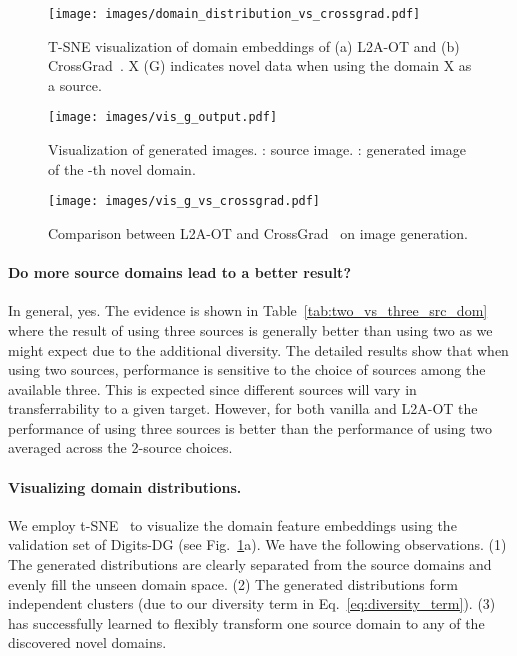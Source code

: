 \documentclass[runningheads]{llncs}
\begin{document}
\begin{figure}[t]
    \centering
    \texttt{[image: images/domain\_distribution\_vs\_crossgrad.pdf]}
    \caption{T-SNE visualization of domain embeddings of (a) L2A-OT and (b) CrossGrad~\cite{shankar2018generalizing}. X (G) indicates novel data when using the domain X as a source.}
    \label{fig:domain_distribution_vs_crossgrad}
\end{figure}

\begin{figure}[t]
    \centering
    \texttt{[image: images/vis\_g\_output.pdf]}
    \caption{Visualization of generated images. : source image. : generated image of the -th novel domain.}
    \label{fig:vis_g_output}
\end{figure}

\begin{figure}[t]
    \centering
    \texttt{[image: images/vis\_g\_vs\_crossgrad.pdf]}
    \caption{Comparison between L2A-OT and CrossGrad~\cite{shankar2018generalizing} on image generation.}
    \label{fig:vis_g_vs_crossgrad}
\end{figure}

\paragraph{Do more source domains lead to a better result?}
In general, yes. The evidence is shown in Table~\ref{tab:two_vs_three_src_dom} where the result of using three sources is generally better than using two as we might expect due to the additional diversity. The detailed results show that when using two sources, performance is sensitive to the choice of sources among the available three. This is expected since different sources will vary in transferrability to a given target. However, for both vanilla and L2A-OT the performance of using three sources is better than the performance of using two averaged across the 2-source choices.

\paragraph{Visualizing domain distributions.}
We employ t-SNE~\cite{tsne} to visualize the domain feature embeddings using the validation set of Digits-DG (see Fig.~\ref{fig:domain_distribution_vs_crossgrad}a).
We have the following observations.
(1) The generated distributions are clearly separated from the source domains and evenly fill the unseen domain space.
(2) The generated distributions form independent clusters (due to our diversity term in Eq.~\eqref{eq:diversity_term}).
(3)  has successfully learned to flexibly transform one source domain to any of the discovered novel domains.
\end{document}
